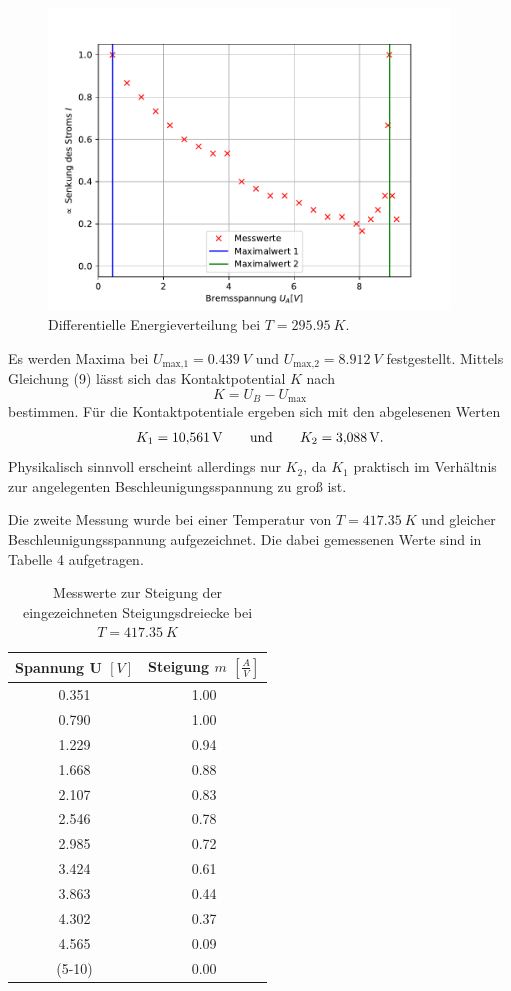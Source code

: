 \begin{figure}[h!]
  \centering
  \includegraphics[height=8cm]{Auswertung/Steigung.pdf}
  \caption{Differentielle Energieverteilung bei $T = \SI{295.95}{K}$.}
  \label{fig:energ}
\end{figure}

Es werden Maxima bei $U_\text{max,1} = \SI{0.439}{V}$ und $U_\text{max,2} = \SI{8.912}{V}$ festgestellt.
Mittels Gleichung (9) lässt sich das Kontaktpotential $K$ nach
\begin{equation}
  K = U_B - U_\text{max}
\end{equation}
bestimmen.
Für die Kontaktpotentiale ergeben sich mit den abgelesenen Werten
\begin{equation}
  K_1 = \SI{10.561}{V} \qquad \text{und} \qquad K_2 = \SI{3.088}{V}.  \notag
\end{equation}
Physikalisch sinnvoll erscheint allerdings nur $K_2$, da $K_1$ praktisch im Verhältnis zur angelegenten Beschleunigungsspannung zu groß ist.

Die zweite Messung wurde bei einer Temperatur von $T = \SI{417.35}{K}$ und gleicher Beschleunigungsspannung aufgezeichnet.
Die dabei gemessenen Werte sind in Tabelle 4 aufgetragen.
\begin{table}
\label{tab:neu}
\centering
  \begin{tabular}{c|c}
    \textbf{Spannung U $[V]$} & \textbf{Steigung $m$ $[\frac{A}{V}]$}\\
    \hline
    0.351 & 1.00 \\
    0.790 & 1.00 \\
    1.229 & 0.94 \\
    1.668 & 0.88 \\
    2.107 & 0.83 \\
    2.546 & 0.78 \\
    2.985 & 0.72 \\
    3.424 & 0.61 \\
    3.863 & 0.44 \\
    4.302 & 0.37 \\
    4.565 & 0.09 \\
    (5-10) & 0.00  
  \end{tabular}
  \caption{Messwerte zur Steigung der eingezeichneten Steigungsdreiecke bei $T = \SI{417.35}{K}$}
\end{table}

